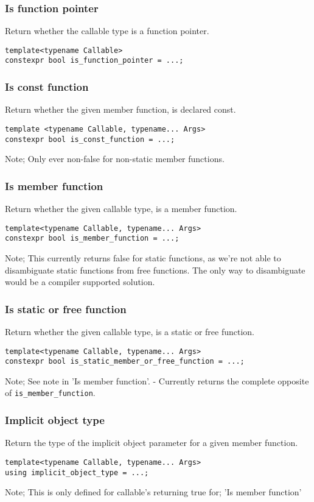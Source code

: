 \subsubsection{Is function pointer}
Return whether the callable type is a function pointer.
\begin{verbatim}
template<typename Callable>
constexpr bool is_function_pointer = ...;
\end{verbatim}

\subsubsection{Is const function}
Return whether the given member function, is declared const.
\begin{verbatim}
template <typename Callable, typename... Args>
constexpr bool is_const_function = ...;
\end{verbatim}
Note; Only ever non-false for non-static member functions.

\subsubsection{Is member function}
Return whether the given callable type, is a member function.
\begin{verbatim}
template<typename Callable, typename... Args>
constexpr bool is_member_function = ...;
\end{verbatim}
Note; This currently returns false for static functions, as we're not able to
disambiguate static functions from free functions.
The only way to disambiguate would be a compiler supported solution.

\subsubsection{Is static or free function}
Return whether the given callable type, is a static or free function.
\begin{verbatim}
template<typename Callable, typename... Args>
constexpr bool is_static_member_or_free_function = ...;
\end{verbatim}
Note; See note in 'Is member function'. - Currently returns the complete
opposite of \verb|is_member_function|.

\subsubsection{Implicit object type}
Return the type of the implicit object parameter for a given member function.
\begin{verbatim}
template<typename Callable, typename... Args>
using implicit_object_type = ...;
\end{verbatim}
Note; This is only defined for callable's returning true for;
'Is member function'

